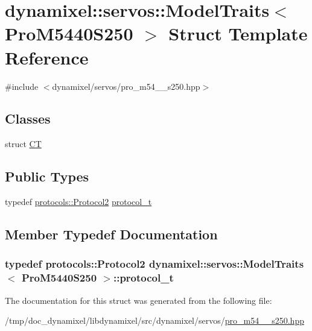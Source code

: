 \hypertarget{structdynamixel_1_1servos_1_1_model_traits_3_01_pro_m5440_s250_01_4}{}\section{dynamixel\+:\+:servos\+:\+:Model\+Traits$<$ Pro\+M5440\+S250 $>$ Struct Template Reference}
\label{structdynamixel_1_1servos_1_1_model_traits_3_01_pro_m5440_s250_01_4}


{\ttfamily \#include $<$dynamixel/servos/pro\+\_\+m54\+\_\+\_\+s250.\+hpp$>$}

\subsection*{Classes}
\begin{DoxyCompactItemize}
\item 
struct \hyperlink{structdynamixel_1_1servos_1_1_model_traits_3_01_pro_m5440_s250_01_4_1_1_c_t}{CT}
\end{DoxyCompactItemize}
\subsection*{Public Types}
\begin{DoxyCompactItemize}
\item 
typedef \hyperlink{classdynamixel_1_1protocols_1_1_protocol2}{protocols\+::\+Protocol2} \hyperlink{structdynamixel_1_1servos_1_1_model_traits_3_01_pro_m5440_s250_01_4_afd94f6cce163097901ea4d7ff080ab34}{protocol\+\_\+t}
\end{DoxyCompactItemize}


\subsection{Member Typedef Documentation}
\subsubsection[{\texorpdfstring{protocol\+\_\+t}{protocol_t}}]{\setlength{\rightskip}{0pt plus 5cm}typedef {\bf protocols\+::\+Protocol2} {\bf dynamixel\+::servos\+::\+Model\+Traits}$<$ {\bf Pro\+M5440\+S250} $>$\+::{\bf protocol\+\_\+t}}\hypertarget{structdynamixel_1_1servos_1_1_model_traits_3_01_pro_m5440_s250_01_4_afd94f6cce163097901ea4d7ff080ab34}{}\label{structdynamixel_1_1servos_1_1_model_traits_3_01_pro_m5440_s250_01_4_afd94f6cce163097901ea4d7ff080ab34}


The documentation for this struct was generated from the following file\+:\begin{DoxyCompactItemize}
\item 
/tmp/doc\+\_\+dynamixel/libdynamixel/src/dynamixel/servos/\hyperlink{pro__m54__40__s250_8hpp}{pro\+\_\+m54\+\_\+\_\+s250.\+hpp}\end{DoxyCompactItemize}
